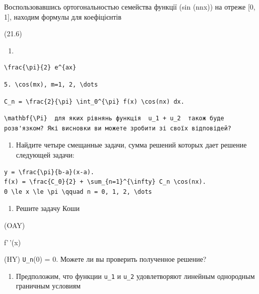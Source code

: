\documentclass[
  ukrainian,
]{article}
\providecommand{\tightlist}{%
  \setlength{\itemsep}{0pt}\setlength{\parskip}{0pt}}
\begin{document}
Воспользовавшись ортогональностью семейства функції (sin (nnx)) на
отреже {[}0, 1{]}, находим формулы для коефіцієнтів

(21.6)

\begin{enumerate}
\def\labelenumi{\alph{enumi})}
\tightlist
\item
\end{enumerate}

\begin{verbatim}
\frac{\pi}{2} e^{ax}
\end{verbatim}

\begin{verbatim}
5. \cos(mx), m=1, 2, \dots
\end{verbatim}

\begin{verbatim}
C_n = \frac{2}{\pi} \int_0^{\pi} f(x) \cos(nx) dx.
\end{verbatim}

\begin{verbatim}
\mathbf{\Pi}  для яких рівнянь функція  u_1 + u_2  також буде розв'язком? Які висновки ви можете зробити зі своїх відповідей?
\end{verbatim}

\begin{enumerate}
\def\labelenumi{\arabic{enumi}.}
\setcounter{enumi}{3}
\tightlist
\item
  Найдите четыре смещанные задачи, сумма решений которых дает решение
  следующей задачи:
\end{enumerate}

\begin{verbatim}
y = \frac{\pi}{b-a}(x-a).
f(x) = \frac{C_0}{2} + \sum_{n=1}^{\infty} C_n \cos(nx).
0 \le x \le \pi \qquad n = 0, 1, 2, \dots
\end{verbatim}

\begin{enumerate}
\def\labelenumi{\arabic{enumi}.}
\setcounter{enumi}{4}
\tightlist
\item
  Решите задачу Коши
\end{enumerate}

(OAY)

f'\,'(x)

(HY) \texttt{U\_n}(0) = 0. Можете ли вы проверить полученное решение?

\begin{enumerate}
\def\labelenumi{\arabic{enumi}.}
\setcounter{enumi}{5}
\tightlist
\item
  Предположим, что функции \texttt{u\_1} и \texttt{u\_2} удовлетворяют
  линейным однородным граничным условиям
\end{enumerate}
\end{document}

